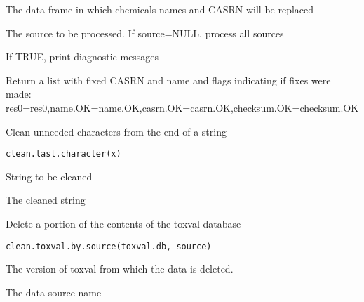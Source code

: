 \documentclass[letterpaper]{book}
\begin{document}
%
\begin{Arguments}
\begin{ldescription}
\item[\code{res0}] The data frame in which chemicals names and CASRN will be replaced

\item[\code{source}] The source to be processed. If source=NULL, process all sources

\item[\code{verbose}] If TRUE, print diagnostic messages
\end{ldescription}
\end{Arguments}
%
\begin{Value}
Return a list with fixed CASRN and name and flags indicating if fixes were made:
res0=res0,name.OK=name.OK,casrn.OK=casrn.OK,checksum.OK=checksum.OK
\end{Value}
%
\begin{Description}\relax
Clean unneeded characters from the end of a string
\end{Description}
%
\begin{Usage}
\begin{verbatim}
clean.last.character(x)
\end{verbatim}
\end{Usage}
%
\begin{Arguments}
\begin{ldescription}
\item[\code{x}] String to be cleaned
\end{ldescription}
\end{Arguments}
%
\begin{Value}
The cleaned string
\end{Value}
%
\begin{Description}\relax
Delete a portion of the contents of the toxval database
\end{Description}
%
\begin{Usage}
\begin{verbatim}
clean.toxval.by.source(toxval.db, source)
\end{verbatim}
\end{Usage}
%
\begin{Arguments}
\begin{ldescription}
\item[\code{toxval.db}] The version of toxval from which the data is deleted.

\item[\code{source}] The data source name
\end{ldescription}
\end{Arguments}
\end{document}
